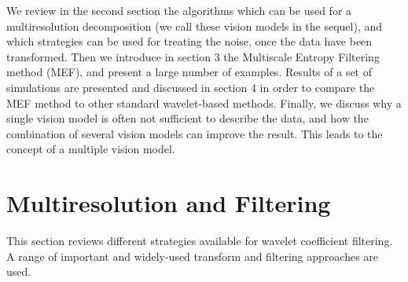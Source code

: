 We review in the second section the algorithms which can be used for 
a multiresolution decomposition (we call these vision models in the 
sequel), and which strategies can be used for treating the noise, once
the data have been transformed. Then we introduce in section 3 the 
Multiscale Entropy Filtering method (MEF), and present a large number
of examples. Results of a set of simulations are presented and discussed
in section 4 in order to compare the MEF method to other standard wavelet-based
methods. Finally, we discuss why a single vision model is often not 
sufficient 
to describe the data, and how the combination of several vision models
can improve the result. This leads to the concept of a multiple vision model. 
 
\section{Multiresolution and Filtering}
This section reviews different strategies available for wavelet 
coefficient filtering.  A range of important and widely-used transform
and filtering approaches are used.  


